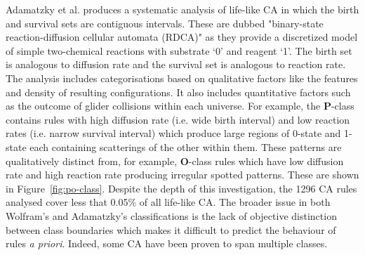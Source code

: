 Adamatzky et al.\cite{adamatzky2006phenomenology} produces a systematic analysis of life-like CA in which the birth and survival sets are contiguous intervals. These are dubbed "binary-state reaction-diffusion cellular automata (RDCA)" as they provide a discretized model of simple two-chemical reactions with substrate `0' and reagent `1'. The birth set is analogous to diffusion rate and the survival set is analogous to reaction rate. The analysis includes categorisations based on qualitative factors like the features and density of resulting configurations. It also includes quantitative factors such as the outcome of glider collisions within each universe. For example, the \textbf{P}-class contains rules with high diffusion rate (i.e. wide birth interval) and low reaction rates (i.e. narrow survival interval) which produce large regions of 0-state and 1-state each containing scatterings of the other within them. These patterns are qualitatively distinct from, for example, \textbf{O}-class rules which have low diffusion rate and high reaction rate producing irregular spotted patterns. These are shown in Figure~\ref{fig:po-class}. Despite the depth of this investigation, the 1296 CA rules analysed cover less that 0.05\% of all life-like CA. The broader issue in both Wolfram's and Adamatzky's classifications is the lack of objective distinction between class boundaries which makes it difficult to predict the behaviour of rules \textit{a priori}. Indeed, some CA have been proven to span multiple classes\cite{baldwin1999classi}.\\


